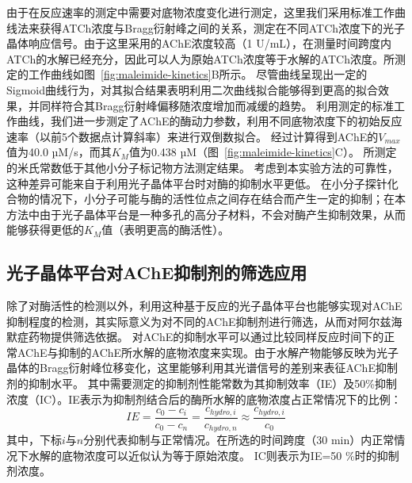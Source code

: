 由于在反应速率的测定中需要对底物浓度变化进行测定，这里我们采用标准工作曲线法来获得ATCh浓度与Bragg衍射峰之间的关系，测定在不同ATCh浓度下的光子晶体响应信号。由于这里采用的AChE浓度较高（1 U/mL），在测量时间跨度内ATCh的水解已经充分，因此可以人为原始ATCh浓度等于水解的ATCh浓度。所测定的工作曲线如图~\ref{fig:maleimide-kinetics}B所示。
尽管曲线呈现出一定的Sigmoid曲线行为，对其拟合结果表明利用二次曲线拟合能够得到更高的拟合效果，并同样符合其Bragg衍射峰偏移随浓度增加而减缓的趋势。
利用测定的标准工作曲线，我们进一步测定了AChE的酶动力参数，利用不同底物浓度下的初始反应速率（以前5个数据点计算斜率）来进行双倒数拟合。
经过计算得到AChE的$V_{max}$值为40.0 µM/s，而其$K_M$值为0.438 µM（图~\ref{fig:maleimide-kinetics}C）。
所测定的米氏常数低于其他小分子标记物方法测定结果\cite{Feng2007Continuous,Wang2009Continuous}。
考虑到本实验方法的可靠性，这种差异可能来自于利用光子晶体平台时对酶的抑制水平更低。
在小分子探针化合物的情况下，小分子可能与酶的活性位点之间存在结合而产生一定的抑制；在本方法中由于光子晶体平台是一种多孔的高分子材料，不会对酶产生抑制效果，从而能够获得更低的$K_M$值（表明更高的酶活性）。

\subsection{光子晶体平台对AChE抑制剂的筛选应用}
除了对酶活性的检测以外，利用这种基于反应的光子晶体平台也能够实现对AChE抑制程度的检测，其实际意义为对不同的AChE抑制剂进行筛选，从而对阿尔兹海默症药物提供筛选依据。
对AChE的抑制水平可以通过比较同样反应时间下的正常AChE与抑制的AChE所水解的底物浓度来实现。由于水解产物能够反映为光子晶体的Bragg衍射峰位移变化，这里能够利用其光谱信号的差别来表征AChE抑制剂的抑制水平。
其中需要测定的抑制剂性能常数为其抑制效率（IE）及50\%抑制浓度（IC）。IE表示为抑制剂结合后的酶所水解的底物浓度占正常情况下的比例：
\begin{equation}
	\label{eqn:ch3-IE}
	IE=\frac{c_0-c_i}{c_0-c_{n}}=\frac{c_{hydro,i}}{c_{hydro,n}}\approx\frac{c_{hydro,i}}{c_0}
\end{equation}
其中，下标$i$与$n$分别代表抑制与正常情况。在所选的时间跨度（30 min）内正常情况下水解的底物浓度可以近似认为等于原始浓度。
IC则表示为IE=50 \%时的抑制剂浓度。

